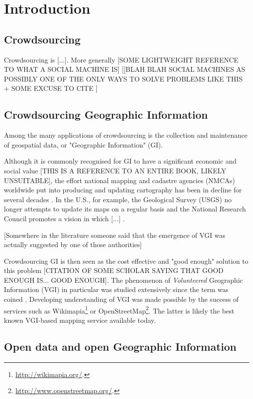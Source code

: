 \section{Introduction}

\subsection{Crowdsourcing}

    Crowdsourcing is {[}...{]}. More generally {[}SOME LIGHTWEIGHT REFERENCE TO WHAT A SOCIAL MACHINE IS{]} [{[}BLAH BLAH SOCIAL MACHINES AS POSSIBLY ONE OF THE ONLY WAYS TO SOLVE PROBLEMS LIKE THIS + SOME EXCUSE TO CITE \cite{OReilly:2015uo}{]}

\subsection{Crowdsourcing Geographic Information}

    Among the many applications of crowdsourcing is the collection and maintenance of geospatial data, or "Geographic Information" (GI).
    
    Although it is commonly recognised for GI to have a significant economic and social value \cite{Sui:2012uf}[THIS IS A REFERENCE TO AN ENTIRE BOOK, LIKELY UNSUITABLE], the effort national mapping and cadastre agencies (NMCAs) worldwide put into producing and updating cartography has been in decline for several decades \cite{ESTES:1994vz}. In the U.S., for example, the Geological Survey (USGS) no longer attempts to update its maps on a regular basis and the National Research Council promotes a vision in which {[}...{]} \cite{Committee:1993vp}.
    
    {[}Somewhere in the literature someone said that the emergence of VGI was actually suggested by one of those authorities{]}
    
    Crowdsourcing GI is then seen as the cost effective and "good enough" solution to this problem [CITATION OF SOME SCHOLAR SAYING THAT GOOD ENOUGH IS... GOOD ENOUGH]. The phenomenon of {\it Volunteered} Geographic Information (VGI) in particular was studied extensively since the term was coined \cite{Goodchild:2007vt}. Developing understanding of VGI was made possible by the success of services such as Wikimapia\footnote{\url{http://wikimapia.org/}.} or OpenStreetMap\footnote{\url{http://www.openstreetmap.org/}.}. The latter is likely the best known VGI-based mapping service available today.

\subsection{Open data and open Geographic Information}

